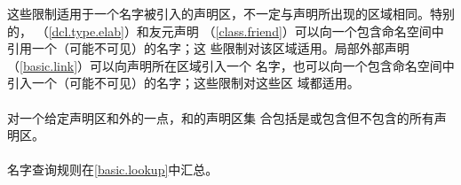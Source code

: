 \begin{note} %
  这些限制适用于一个名字被引入的声明区，不一定与声明所出现的区域相同。特别的，
  （\ref{dcl.type.elab}）和友元声明
  （\ref{class.friend}）可以向一个包含命名空间中引用一个（可能不可见）的名字；这
  些限制对该区域适用。局部外部声明（\ref{basic.link}）可以向声明所在区域引入一个
  名字，也可以向一个包含命名空间中引入一个（可能不可见）的名字；这些限制对这些区
  域都适用。
\end{note}

\paragraph{} %
对一个给定声明区和外的一点，和的声明区集
合包括是或包含但不包含的所有声明区。

\paragraph{} %
\begin{note} %
  名字查询规则在\ref{basic.lookup}中汇总。
\end{note}
